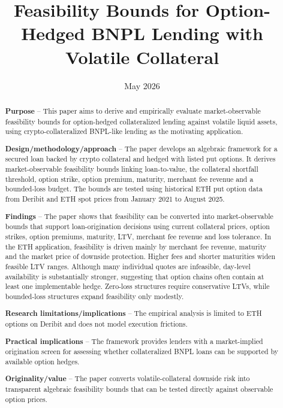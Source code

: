 \documentclass[11pt]{article}
\title{Feasibility Bounds for Option-Hedged BNPL Lending with Volatile Collateral}
\date{May 2026}
\begin{document}
\maketitle

\begin{abstract}
\noindent \textbf{Purpose} -- This paper aims to derive and empirically evaluate market-observable feasibility bounds for option-hedged collateralized lending against volatile liquid assets, using crypto-collateralized BNPL-like lending as the motivating application.

\medskip

\noindent \textbf{Design/methodology/approach} -- The paper develops an algebraic framework for a secured loan backed by crypto collateral and hedged with listed put options. It derives market-observable feasibility bounds linking loan-to-value, the collateral shortfall threshold, option strike, option premium, maturity, merchant fee revenue and a bounded-loss budget. The bounds are tested using historical ETH put option data from Deribit and ETH spot prices from January 2021 to August 2025.

\medskip

\noindent \textbf{Findings} -- The paper shows that feasibility can be converted into market-observable bounds that support loan-origination decisions using current collateral prices, option strikes, option premiums, maturity, LTV, merchant fee revenue and loss tolerance. In the ETH application, feasibility is driven mainly by merchant fee revenue, maturity and the market price of downside protection. Higher fees and shorter maturities widen feasible LTV ranges. Although many individual quotes are infeasible, day-level availability is substantially stronger, suggesting that option chains often contain at least one implementable hedge. Zero-loss structures require conservative LTVs, while bounded-loss structures expand feasibility only modestly.

\medskip

\noindent \textbf{Research limitations/implications} -- The empirical analysis is limited to ETH options on Deribit and does not model execution frictions.

\medskip

\noindent \textbf{Practical implications} -- The framework provides lenders with a market-implied origination screen for assessing whether collateralized BNPL loans can be supported by available option hedges.

\medskip

\noindent \textbf{Originality/value} -- The paper converts volatile-collateral downside risk into transparent algebraic feasibility bounds that can be tested directly against observable option prices.
\end{abstract}
\end{document}
